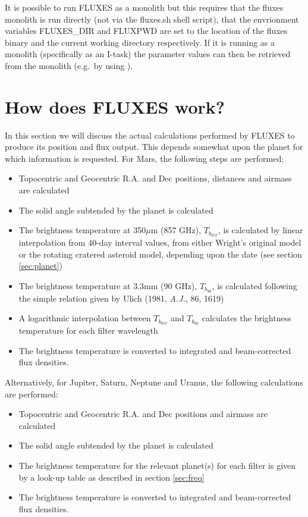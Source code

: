 \documentclass[11pt,twoside]{starlink}
\begin{document}
It is possible to run FLUXES as a monolith but this requires
that the fluxes monolith is run directly (not via the fluxes.sh
shell script), that the envrionment variables
FLUXES\_DIR and FLUXPWD are set to the location of the fluxes binary
and the current working directory respectively. If it is running
as a monolith (specifically as an I-task) the parameter values can
then be retrieved from the monolith (e.g.\ by using
 ).

\section{How does FLUXES work?}
\label{sec:howfluxesworks}

In this section we will discuss the actual calculations performed by FLUXES to produce its position and flux output.  This depends somewhat upon the planet for which information is requested.  For Mars, the following steps are performed:

\begin{itemize}
\item{Topocentric and Geocentric R.A. and Dec positions, distances and airmass are calculated}
\item{The solid angle subtended by the planet is calculated}
\item{The brightness temperature at 350$\mu$m (857 GHz), $T_{b_{857}}$,  is calculated by linear interpolation from 40-day interval values, from either Wright's original model or the rotating cratered asteroid model, depending upon the date (see section \ref{sec:planet})}
\item{The brightness temperature at 3.3mm (90 GHz), $T_{b_{90}}$, is calculated following the simple relation given by Ulich (1981, \textit{A.J.}, 86, 1619)}
\item{A logarithmic interpolation between $T_{b_{857}}$ and $T_{b_{90}}$ calculates the brightness temperature for each filter wavelength}
\item{The brightness temperature is converted to integrated and beam-corrected flux densities.}
\end{itemize}

Alternatively, for Jupiter, Saturn, Neptune and Uranus, the following calculations are performed:

\begin{itemize}
\item{Topocentric and Geocentric R.A. and Dec positions and airmass are calculated}
\item{The solid angle subtended by the planet is calculated}
\item{The brightness temperature for the relevant planet(s) for each filter is given by a look-up table as described in section \ref{sec:freq}}
\item{The brightness temperature is converted to integrated and beam-corrected flux densities.}
\end{itemize}
\end{document}
